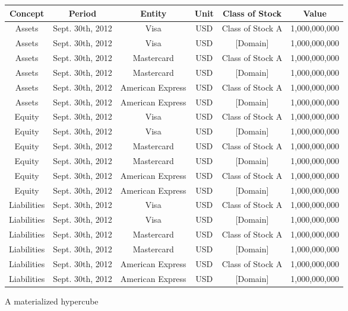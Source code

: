 \documentclass{vldb}
\begin{document}
\begin{figure*}
\caption{A materialized hypercube}
\label{fig-materialized}
\begin{tabular}{|c|c|c|c|c||c|}
\hline
Concept & Period & Entity & Unit & Class of Stock & Value \\
\hline
Assets & Sept. 30th, 2012 & Visa & USD & Class of Stock A & 1,000,000,000 \\
Assets & Sept. 30th, 2012 & Visa & USD & [Domain] & 1,000,000,000 \\
Assets & Sept. 30th, 2012 & Mastercard & USD & Class of Stock A & 1,000,000,000 \\
Assets & Sept. 30th, 2012 & Mastercard & USD & [Domain] & 1,000,000,000 \\
Assets & Sept. 30th, 2012 & American Express & USD & Class of Stock A & 1,000,000,000 \\
Assets & Sept. 30th, 2012 & American Express & USD & [Domain] & 1,000,000,000 \\
Equity & Sept. 30th, 2012 & Visa & USD & Class of Stock A & 1,000,000,000 \\
Equity & Sept. 30th, 2012 & Visa &USD &  [Domain] & 1,000,000,000 \\
Equity & Sept. 30th, 2012 & Mastercard & USD & Class of Stock A & 1,000,000,000 \\
Equity & Sept. 30th, 2012 & Mastercard & USD & [Domain] & 1,000,000,000 \\
Equity & Sept. 30th, 2012 & American Express & USD & Class of Stock A & 1,000,000,000 \\
Equity & Sept. 30th, 2012 & American Express & USD & [Domain] & 1,000,000,000 \\
Liabilities & Sept. 30th, 2012 & Visa & USD & Class of Stock A & 1,000,000,000 \\
Liabilities & Sept. 30th, 2012 & Visa & USD & [Domain] & 1,000,000,000 \\
Liabilities & Sept. 30th, 2012 & Mastercard & USD & Class of Stock A & 1,000,000,000 \\
Liabilities & Sept. 30th, 2012 & Mastercard & USD & [Domain] & 1,000,000,000 \\
Liabilities & Sept. 30th, 2012 & American Express & USD & Class of Stock A & 1,000,000,000 \\
Liabilities & Sept. 30th, 2012 & American Express & USD & [Domain] & 1,000,000,000 \\
\hline
\end{tabular}
\end{figure*}
\end{document}
